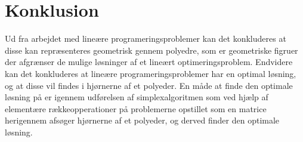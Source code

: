 \chapter{Konklusion}
Ud fra arbejdet med lineære programeringsproblemer kan det konkluderes at disse kan repræsenteres geometrisk gennem polyedre, som er geometriske figruer der afgrænser de mulige løsninger af et lineært optimeringsproblem.
Endvidere kan det konkluderes at lineære programeringsproblemer har en optimal løsning, og at disse vil findes i hjørnerne af et polyeder.
En måde at finde den optimale løsning på er igennem udførelsen af simplexalgoritmen som ved hjælp af elementære rækkeopperationer på problemerne opstillet som en matrice herigennem afsøger hjørnerne af et polyeder, og derved finder den optimale løsning.